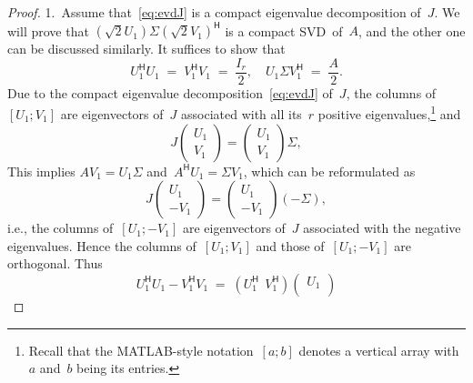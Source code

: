 \documentclass[11pt,a4paper]{article}  %
\numberwithin{equation}{section}
\theoremstyle{definition}
\newcommand{\hmt}{{\scriptscriptstyle{{\mathsf{H}}}}}
\newcommand{\ie}{{i.e.}}
\begin{document}
\begin{proof} 1.~Assume that~\eqref{eq:evdJ} is a compact eigenvalue decomposition of~$J$.
  We will prove that $(\sqrt{2} U_1)\Sigma (\sqrt{2} V_1)^\hmt$ is a
  compact SVD~of~$A$, and the other one can be discussed similarly.
  It suffices to show that
  \begin{equation}
    \label{eq:svdA}
    U_1^\hmt U_1 \;=\; V_1^\hmt V_1 \;=\; \dfrac{I_r}{2},
    \quad U_1\Sigma V_1^\hmt \;=\; \dfrac{A}{2}.
  \end{equation}
  Due to the compact eigenvalue decomposition~\eqref{eq:evdJ} of~$J$,
  the columns of~$[U_1; V_1]$ are eigenvectors of~$J$ associated with
  all its~$r$ positive eigenvalues,\footnote{
   Recall that the MATLAB-style notation~$[a; b]$ denotes a vertical
   array with~$a$ and~$b$ being its entries.
  }
  and
  \begin{equation}
    \label{eq:evd1}
    J
    \begin{pmatrix}
      U_1 \\
      V_1
    \end{pmatrix}
    =
    \begin{pmatrix}
      U_1 \\
      V_1
    \end{pmatrix}
    \Sigma,
  \end{equation}
   This implies $AV_1 = U_1\Sigma$ and~$A^\hmt U_1 = \Sigma V_1$, which can be reformulated as
  \begin{equation}
    \label{eq:evd2}
    J
    \begin{pmatrix}
      U_1 \\
      -V_1
    \end{pmatrix}
    =
    \begin{pmatrix}
      U_1 \\
      -V_1
    \end{pmatrix}
    (-\Sigma),
  \end{equation}
  \ie, the columns of~$[U_1; -V_1]$ are eigenvectors of~$J$ associated with the negative eigenvalues.
  Hence the columns of~$[U_1; V_1]$ and those of~$[U_1; -V_1]$ are orthogonal. Thus
  \begin{equation*}
    U_1^\hmt U_1 -V_1^\hmt V_1 \;=\;
    (U_1^\hmt \;\, V_1^\hmt)
    \begin{pmatrix}
      U_1\\

\end{pmatrix}
\end{equation*}
\end{proof}
\end{document}
